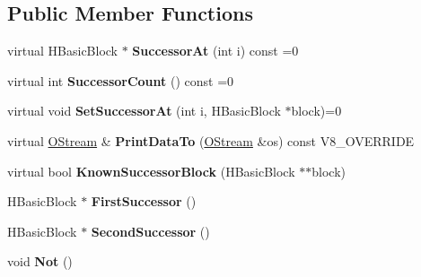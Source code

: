 \subsection*{Public Member Functions}
\begin{DoxyCompactItemize}
\item 
\hypertarget{classv8_1_1internal_1_1_h_control_instruction_aed25812b4037d91f166ea66b65cb01b1}{}virtual H\+Basic\+Block $\ast$ {\bfseries Successor\+At} (int i) const =0\label{classv8_1_1internal_1_1_h_control_instruction_aed25812b4037d91f166ea66b65cb01b1}

\item 
\hypertarget{classv8_1_1internal_1_1_h_control_instruction_a93ccf5d704e8d4aa8288a02b5af6a8cf}{}virtual int {\bfseries Successor\+Count} () const =0\label{classv8_1_1internal_1_1_h_control_instruction_a93ccf5d704e8d4aa8288a02b5af6a8cf}

\item 
\hypertarget{classv8_1_1internal_1_1_h_control_instruction_aabba92a6ef39584c1060c2c136b3335a}{}virtual void {\bfseries Set\+Successor\+At} (int i, H\+Basic\+Block $\ast$block)=0\label{classv8_1_1internal_1_1_h_control_instruction_aabba92a6ef39584c1060c2c136b3335a}

\item 
\hypertarget{classv8_1_1internal_1_1_h_control_instruction_ac69343b7d4eab52a77dc539f5c77dee0}{}virtual \hyperlink{classv8_1_1internal_1_1_o_stream}{O\+Stream} \& {\bfseries Print\+Data\+To} (\hyperlink{classv8_1_1internal_1_1_o_stream}{O\+Stream} \&os) const V8\+\_\+\+O\+V\+E\+R\+R\+I\+D\+E\label{classv8_1_1internal_1_1_h_control_instruction_ac69343b7d4eab52a77dc539f5c77dee0}

\item 
\hypertarget{classv8_1_1internal_1_1_h_control_instruction_aa24cfcc45bc614df7cde6ae9683b1224}{}virtual bool {\bfseries Known\+Successor\+Block} (H\+Basic\+Block $\ast$$\ast$block)\label{classv8_1_1internal_1_1_h_control_instruction_aa24cfcc45bc614df7cde6ae9683b1224}

\item 
\hypertarget{classv8_1_1internal_1_1_h_control_instruction_a64596daff869b8baea9c9e7eb55498e3}{}H\+Basic\+Block $\ast$ {\bfseries First\+Successor} ()\label{classv8_1_1internal_1_1_h_control_instruction_a64596daff869b8baea9c9e7eb55498e3}

\item 
\hypertarget{classv8_1_1internal_1_1_h_control_instruction_a7a9cda2d41e43221518331e97b8e3cad}{}H\+Basic\+Block $\ast$ {\bfseries Second\+Successor} ()\label{classv8_1_1internal_1_1_h_control_instruction_a7a9cda2d41e43221518331e97b8e3cad}

\item 
\hypertarget{classv8_1_1internal_1_1_h_control_instruction_ae92847e23a38a930cb2c929722ec9bd3}{}void {\bfseries Not} ()\label{classv8_1_1internal_1_1_h_control_instruction_ae92847e23a38a930cb2c929722ec9bd3}

\end{DoxyCompactItemize}
